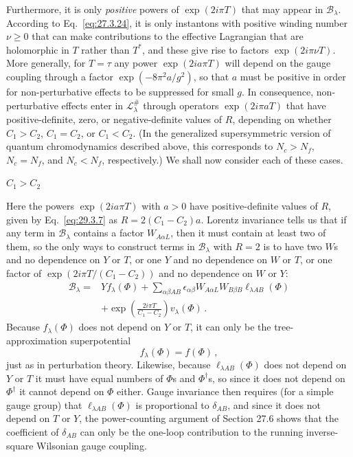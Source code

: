 Furthermore, it is only \emph{positive} powers of \(\exp(2i\pi T)\) that
may appear in \(\mathcal{B}_\lambda\). According to
Eq.~\eqref{eq:27.3.24}, it is only instantons with positive winding number
\(\nu\geq0\) that can make contributions to the effective Lagrangian that
are holomorphic in \(T\) rather than \(T^*\), and these give rise to
factors \(\exp(2i\pi\nu T)\). More generally, for \(T=\tau\) any power
\(\exp(2ia\pi T)\) will depend on the gauge coupling through a factor
\(\exp(-8\pi^2a/g^2)\), so that \(a\) must be positive in order for
non-perturbative effects to be suppressed for small \(g\). In consequence,
non-perturbative effects enter in \(\mathcal{L}^{\#}_\lambda\) through
operators \(\exp(2i\pi aT)\) that have positive-definite, zero, or
negative-definite values of \(R\), depending on whether \(C_1>C_2\),
\(C_1=C_2\), or \(C_1<C_2\). (In the generalized supersymmetric version
of quantum chromodynamics described above, this corresponds to \(N_c>N_f\),
\(N_c=N_f\), and \(N_c<N_f\), respectively.) We shall now consider each
of these cases.

\begin{center}
  \(C_1>C_2\)
\end{center}

Here the powers \(\exp(2ia\pi T)\) with \(a>0\) have positive-definite
values of \(R\), given by Eq.~\eqref{eq:29.3.7} as
\(R=2(C_1-C_2)a\). Lorentz invariance tells us that if any term in
\(\mathcal{B}_\lambda\) contains a factor \(W_{A\alpha L}\), then it must
contain at least two of them, so the only ways to construct terms in
\(\mathcal{B}_\lambda\) with \(R=2\) is to have two \(W\)s and no
dependence on \(Y\) or \(T\), or one \(Y\) and no dependence on \(W\) or
\(T\), or one factor of \(\exp(2i\pi T/(C_1-C_2))\) and no dependence
on \(W\) or \(Y\):
\begin{equation}
  \begin{aligned}
  \mathcal{B}_\lambda
  ={}&
  Yf_\lambda(\Phi)
  +\sum_{\alpha\beta AB}
  \epsilon_{\alpha\beta}W_{A\alpha L}W_{B\beta B}
  \ell_{\lambda AB}(\Phi)
  \\
  &+\exp\left(\frac{2i\pi T}{C_1-C_2}\right)v_\lambda(\Phi)\,.
  \end{aligned}
  \tag{29.3.9}\label{eq:29.3.9}
\end{equation}
Because \(f_\lambda(\Phi)\) does not depend on \(Y\) or \(T\), it can only
be the tree-approximation superpotential
\begin{equation}
  f_\lambda(\Phi)=f(\Phi)\,,
  \tag{29.3.10}\label{eq:29.3.10}
\end{equation}
just as in perturbation theory. Likewise, because
\(\ell_{\lambda AB}(\Phi)\) does not depend on \(Y\) or \(T\) it must
have equal numbers of \(\Phi\)s and \(\Phi^\dagger\)s, so since it does
not depend on \(\Phi^\dagger\) it cannot depend on \(\Phi\) either. Gauge
invariance then requires (for a simple gauge group) that
\(\ell_{\lambda AB}(\Phi)\) is proportional to \(\delta_{AB}\), and since
it does not depend on \(T\) or \(Y\), the power-counting argument of
Section 27.6 shows that the coefficient of \(\delta_{AB}\) can only be the
one-loop contribution to the running inverse-square Wilsonian gauge
coupling.

